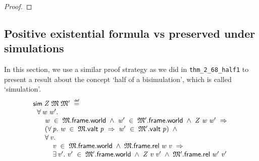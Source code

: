 \documentclass[letterpaper]{article}
\renewcommand{\HOLConst}[1]{{\textsf{\upshape\small #1}}}
\newenvironment{holmath}{\begin{displaymath}\begin{array}{l}}{\end{array}\end{displaymath}\ignorespacesafterend}
\begin{document}
\begin{proof}


\end{proof}
\subsection{Positive existential formula vs preserved under simulations}
In this section, we use a similar proof strategy as we did in \texttt{thm_2_68_half1} to present a result about the concept `half of a bisimulation', which is called `simulation'.
\begin{holmath}
  \HOLConst{sim}\;\HOLFreeVar{Z}\;\HOLFreeVar{\ensuremath{\mathfrak{M}}}\;\HOLFreeVar{\ensuremath{\mathfrak{M}'}}\;\HOLSymConst{\HOLTokenDefEquality{}}\\
\;\;\HOLSymConst{\HOLTokenForall{}}\HOLBoundVar{w}\;\HOLBoundVar{w\sp{\prime}}.\\
\;\;\;\;\;\;\HOLBoundVar{w}\;\HOLSymConst{\HOLTokenIn{}}\;\HOLFreeVar{\ensuremath{\mathfrak{M}}}.\HOLFieldName{frame}.\HOLFieldName{world}\;\HOLSymConst{\HOLTokenConj{}}\;\HOLBoundVar{w\sp{\prime}}\;\HOLSymConst{\HOLTokenIn{}}\;\HOLFreeVar{\ensuremath{\mathfrak{M}'}}.\HOLFieldName{frame}.\HOLFieldName{world}\;\HOLSymConst{\HOLTokenConj{}}\;\HOLFreeVar{Z}\;\HOLBoundVar{w}\;\HOLBoundVar{w\sp{\prime}}\;\HOLSymConst{\HOLTokenImp{}}\\
\;\;\;\;\;\;(\HOLSymConst{\HOLTokenForall{}}\HOLBoundVar{p}.\;\HOLBoundVar{w}\;\HOLSymConst{\HOLTokenIn{}}\;\HOLFreeVar{\ensuremath{\mathfrak{M}}}.\HOLFieldName{valt}\;\HOLBoundVar{p}\;\HOLSymConst{\HOLTokenImp{}}\;\HOLBoundVar{w\sp{\prime}}\;\HOLSymConst{\HOLTokenIn{}}\;\HOLFreeVar{\ensuremath{\mathfrak{M}'}}.\HOLFieldName{valt}\;\HOLBoundVar{p})\;\HOLSymConst{\HOLTokenConj{}}\\
\;\;\;\;\;\;\HOLSymConst{\HOLTokenForall{}}\HOLBoundVar{v}.\\
\;\;\;\;\;\;\;\;\;\;\HOLBoundVar{v}\;\HOLSymConst{\HOLTokenIn{}}\;\HOLFreeVar{\ensuremath{\mathfrak{M}}}.\HOLFieldName{frame}.\HOLFieldName{world}\;\HOLSymConst{\HOLTokenConj{}}\;\HOLFreeVar{\ensuremath{\mathfrak{M}}}.\HOLFieldName{frame}.\HOLFieldName{rel}\;\HOLBoundVar{w}\;\HOLBoundVar{v}\;\HOLSymConst{\HOLTokenImp{}}\\
\;\;\;\;\;\;\;\;\;\;\HOLSymConst{\HOLTokenExists{}}\HOLBoundVar{v\sp{\prime}}.\;\HOLBoundVar{v\sp{\prime}}\;\HOLSymConst{\HOLTokenIn{}}\;\HOLFreeVar{\ensuremath{\mathfrak{M}'}}.\HOLFieldName{frame}.\HOLFieldName{world}\;\HOLSymConst{\HOLTokenConj{}}\;\HOLFreeVar{Z}\;\HOLBoundVar{v}\;\HOLBoundVar{v\sp{\prime}}\;\HOLSymConst{\HOLTokenConj{}}\;\HOLFreeVar{\ensuremath{\mathfrak{M}'}}.\HOLFieldName{frame}.\HOLFieldName{rel}\;\HOLBoundVar{w\sp{\prime}}\;\HOLBoundVar{v\sp{\prime}}
\end{holmath}
\end{document}
